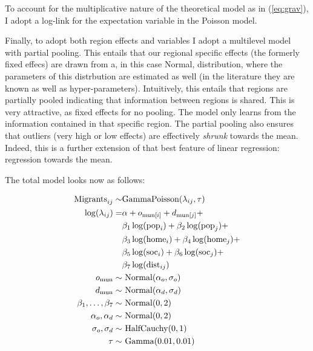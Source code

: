 \documentclass[fleqn,10pt]{SelfArx} %
\begin{document}
        To account for the multiplicative nature of the theoretical
        model as in (\ref{eq:grav}), I adopt a log-link for the
        expectation variable in the Poisson model.

        Finally, to adopt both region effects and variables I adopt a
        multilevel model with partial pooling. This entails that our
        regional specific effects (the formerly fixed effecs) are
        drawn from a, in this case Normal, distribution, where the
        parameters of this distrbution are estimated as well (in the
        literature they are known as well as
        hyper-parameters). Intuitively, this entails that regions are
        partially pooled indicating that information between regions
        is shared. This is very attractive, as fixed effects for no
        pooling. The model only learns from the information contained
        in that specific region. The partial pooling also ensures that
        outliers (very high or low effects) are effectively
        \emph{shrunk} towards the mean. Indeed, this is a further
        extension of that best feature of linear regression:
        regression towards the mean.

        The total model looks now as follows:
        
        \begin{subequations}
          \begin{align} \text{Migrants}_{ij} \sim & \text{GammaPoisson}(\lambda_{ij}, \tau) \label{outcome}\\
            \log(\lambda_{ij}) =
            & \alpha + o_{\text{mun}[i]} + d_{\text{mun}[j]} + \notag
            \\ & \beta_1 \log(\text{pop}_i) +
            \beta_2\log(\text{pop}_j) + \notag \\ & \beta_3
            \log(\text{home}_i) + \beta_4 \log(\text{home}_j) + \notag\\
            & \beta_5 \log(\text{soc}_i) + \beta_6 \log(\text{soc}_j)
            + \notag \\ & \beta_7 \log(\text{dist}_{ij}) \label{linear} \\
            o_{\text{mun}} \sim& \text{ Normal}(\alpha_o, \sigma_o) \label{muno} \\
            d_{\text{mun}} \sim& \text{ Normal}(\alpha_d, \sigma_d) \label{mund} \\
            \beta_1,\ldots, \beta_7 \sim& \text{
                                          Normal}(0,2)\\ \alpha_o, \alpha_d \sim& \text{ Normal}(0,2)\\
            \sigma_o, \sigma_d \sim& \text{ HalfCauchy}(0,1) \\ \tau
            \sim& \text{ Gamma}(0.01, 0.01)
          \end{align}
          \label{model}
        \end{subequations}
\end{document}
